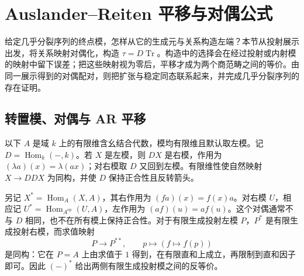 
\section{Auslander–Reiten 平移与对偶公式}
\label{b5:sec:1006}

给定几乎分裂序列的终点模，怎样从它的生成元与关系构造左端？本节从投射展示出发，将关系映射对偶化，构造 \(\tau=D\operatorname{Tr}\)。构造中的选择会在经过投射或内射模的映射中留下误差；把这些映射视为零后，平移才成为两个商范畴之间的等价。由同一展示得到的对偶配对，则把扩张与稳定同态联系起来，并完成几乎分裂序列的存在证明。

\subsection{转置模、对偶与 AR 平移}
\label{b5:subsec:1006:01}

以下 \(A\) 是域 \(k\) 上的有限维含幺结合代数，模均有限维且默认取左模。记 \(D=\operatorname{Hom}_k(-,k)\)。若 \(X\) 是左模，则 \(DX\) 是右模，作用为 \((\lambda a)(x)=\lambda(ax)\)；对右模取 \(D\) 又回到左模。有限维性使自然映射 \(X\to DDX\) 为同构，并使 \(D\) 保持正合性且反转箭头。

\ProseParagraphBreak
另记 \(X^*=\operatorname{Hom}_A(X,A)\)，其右作用为 \((fa)(x)=f(x)a\)。对右模 \(U\)，相应记 \(U^*=\operatorname{Hom}_{A^{\mathrm{op}}}(U,A)\)，左作用为 \((af)(u)=af(u)\)。这个对偶通常不与 \(D\) 相同，也不在所有模上保持正合性。对于有限生成投射左模 \(P\)，\(P^*\) 是有限生成投射右模，而求值映射
\[
	P\longrightarrow P^{**},\qquad p\longmapsto(f\mapsto f(p))
\]
是同构：它在 \(P=A\) 上由求值于 \(1\) 得到，在有限直和上成立，再限制到直和因子即可。因此 \((-)^*\) 给出两侧有限生成投射模之间的反等价。

